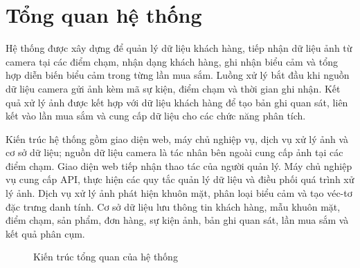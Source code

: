 \documentclass[../LuanVan.tex]{subfiles}
\begin{document}
\section{Tổng quan hệ thống}
\label{section:4.1}

Hệ thống được xây dựng để quản lý dữ liệu khách hàng, tiếp nhận dữ liệu ảnh từ camera tại các điểm chạm, nhận dạng khách hàng, ghi nhận biểu cảm và tổng hợp diễn biến biểu cảm trong từng lần mua sắm. Luồng xử lý bắt đầu khi nguồn dữ liệu camera gửi ảnh kèm mã sự kiện, điểm chạm và thời gian ghi nhận. Kết quả xử lý ảnh được kết hợp với dữ liệu khách hàng để tạo bản ghi quan sát, liên kết vào lần mua sắm và cung cấp dữ liệu cho các chức năng phân tích.

Kiến trúc hệ thống gồm giao diện web, máy chủ nghiệp vụ, dịch vụ xử lý ảnh và cơ sở dữ liệu; nguồn dữ liệu camera là tác nhân bên ngoài cung cấp ảnh tại các điểm chạm.
Giao diện web tiếp nhận thao tác của người quản lý. Máy chủ nghiệp vụ cung cấp API, thực hiện các quy tắc quản lý dữ liệu và điều phối quá trình xử lý ảnh. Dịch vụ xử lý ảnh phát hiện khuôn mặt, phân loại biểu cảm và tạo véc-tơ đặc trưng danh tính. Cơ sở dữ liệu lưu thông tin khách hàng, mẫu khuôn mặt, điểm chạm, sản phẩm, đơn hàng, sự kiện ảnh, bản ghi quan sát, lần mua sắm và kết quả phân cụm.

\begin{figure}[H]
    \centering
    \caption{Kiến trúc tổng quan của hệ thống}
    \label{fig:component_architecture_ch4}
\end{figure}
\end{document}
